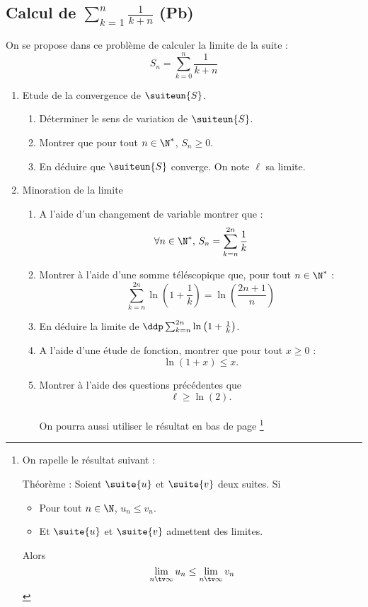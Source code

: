 \subsection{Calcul de $\sum_{k=1}^n \frac{1}{k+n}$ (Pb)}



\begin{probleme}
On se propose dans ce problème de calculer la limite de la  suite : 
$$S_n=\sum_{k=0}^{n} \frac{1}{k+n}$$


\begin{enumerate}
\item Etude de la convergence de $\suiteun{S}$.
\begin{enumerate}
\item  Déterminer le sens de variation de $\suiteun{S}$.
\item Montrer que pour tout $n\in \N^*$, $S_n \geq 0$.
\item En déduire que $\suiteun{S}$ converge.  On note $\ell $ sa limite. 
\end{enumerate}

\item   Minoration de la limite
\begin{enumerate}

\item A l'aide d'un changement de variable montrer que : 
$$\forall n\in \N^*,\,  S_n  =\sum_{k=n}^{2n}\frac1{k}$$
\item Montrer à l'aide d'une somme téléscopique que, pour tout $n\in\N^*$ :
$$\sum_{k=n}^{2n} \ln\left( 1 +\frac{1}{k}\right) =\ln\left(\frac{2n+1}{n}\right) $$

\item En déduire la limite de $\ddp \sum_{k=n}^{2n}\ln\left( 1 +\frac{1}{k}\right)$.

\item A l'aide d'une étude de fonction,  montrer que pour tout $x\geq 0 $ :
$$ \ln (1+x) \leq x.$$

\item Montrer à l'aide des questions précédentes que $$\ell \geq \ln(2).$$\\ \footnotesize{On pourra aussi utiliser le résultat en bas de page \footnote{ On rapelle le résultat suivant : 

Théorème  : Soient  $\suite{u}$ et $\suite{v}$ deux suites. Si
\begin{itemize}
\item Pour tout $n\in \N $, $u_n\leq v_n$.
\item  Et $\suite{u}$ et $\suite{v}$ admettent des limites.
\end{itemize} 
Alors 
$$\lim_{n\tv \infty} u_n \leq \lim_{n\tv \infty} v_n$$

}}
\end{enumerate}
\end{enumerate}
\end{probleme}
